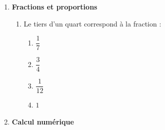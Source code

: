 \documentclass[12pt,a4paper]{article}
\begin{document}
\begin{enumerate}
\begin{enumerate}[label=\arabic{*}.\arabic*]
\item On considère les nombres :
\[
A=\frac{1}{5}, \quad B=\frac{19}{100}, \quad C=0{,}21
\]
Le classement par ordre croissant est :
\begin{multicols}{2}
\begin{enumerate}[label=\alph*)]
\item $A < B < C$
\item $A < C < B$
\item $B < A < C$
\item $C < B < A$
\end{enumerate}
\end{multicols}

\item Parmi les nombres suivants, le \textbf{plus grand} est :
\[
A=\left(\frac{1}{5}\right)^2 \quad
B=\left(\frac{1}{2}\right)^5 \quad
C=0{,}05 \quad
D=\left(\frac{1}{3}\right)^3
\]
\begin{multicols}{2}
\begin{enumerate}[label=\alph*)]
\item $A$
\item $B$
\item $C$
\item $D$
\end{enumerate}
\end{multicols}
\end{enumerate}

\item \textbf{Fractions et proportions}

\begin{enumerate}[label=\arabic{*}.\arabic*]
\item Le tiers d’un quart correspond à la fraction :
\begin{multicols}{2}
\begin{enumerate}[label=\alph*)]
\item $\dfrac{1}{7}$
\item $\dfrac{3}{4}$
\item $\dfrac{1}{12}$
\item $1$
\end{enumerate}
\end{multicols}
\end{enumerate}

\item \textbf{Calcul numérique}


\end{enumerate}
\end{document}
